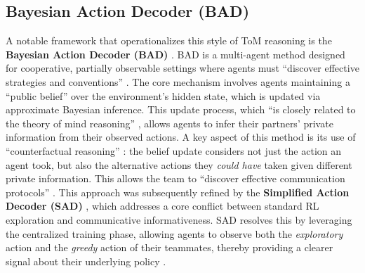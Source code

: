 \documentclass[12pt, a4paper]{report}
\begin{document}
\subsection{Bayesian Action Decoder (BAD)}
A notable framework that operationalizes this style of ToM reasoning is the \textbf{Bayesian Action Decoder (BAD)} \cite{BayesAD}. BAD is a multi-agent method designed for cooperative, partially observable settings where agents must ``discover effective strategies and conventions'' \cite{BayesAD}. The core mechanism involves agents
maintaining a ``public belief'' over the environment's hidden state, which is updated via approximate Bayesian inference. This update process, which ``is closely related to the theory of mind reasoning'' \cite{BayesAD}, allows agents to infer their partners' private information from their observed actions. A key aspect of this method is its use of ``counterfactual reasoning'' \cite{BayesAD}: the belief update considers not just the action an agent took, but also the alternative actions they \textit{could have} taken given different private information. This allows the team to ``discover effective communication protocols'' \cite{BayesAD}. This approach was subsequently refined by the \textbf{Simplified Action Decoder (SAD)} \cite{Hu_Foerster_2021}, which addresses a core conflict between standard RL exploration and communicative informativeness. SAD resolves this by leveraging the centralized training phase, allowing agents to observe both the \textit{exploratory} action and the \textit{greedy} action of their teammates, thereby providing a clearer signal about their underlying policy \cite{Hu_Foerster_2021}.
\end{document}
